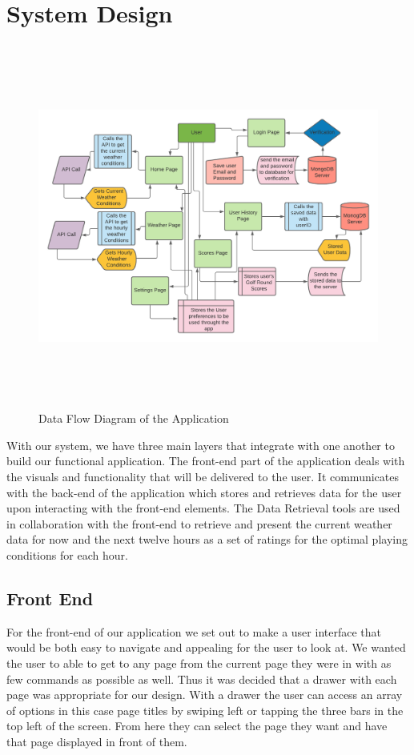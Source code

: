 \chapter{System Design}
\begin{figure}[H]
    \centering
    \includegraphics[width=14cm, height=12cm]{img/dfd.png}
    \caption{Data Flow Diagram of the Application}
    \label{fig:Data Flow Diagram of the Application}
\end{figure}
With our system, we have three main layers that integrate with one another to build our functional application. The front-end part of the application deals with the visuals and functionality that will be delivered to the user. It communicates with the back-end of the application which stores and retrieves data for the user upon interacting with the front-end elements. The Data Retrieval tools are used in collaboration with the front-end to retrieve and present the current weather data for now and the next twelve hours as a set of ratings for the optimal playing conditions for each hour.
\section{Front End}
For the front-end of our application we set out to make a user interface that would be both easy to navigate and appealing for the user to look at. We wanted the user to able to get to any page from the current page they were in with as few commands as possible as well. Thus it was decided that a drawer with each page was appropriate for our design. With a drawer the user can access an array of options in this case page titles by swiping left or tapping the three bars in the top left of the screen. From here they can select the page they want and have that page displayed in front of them.
